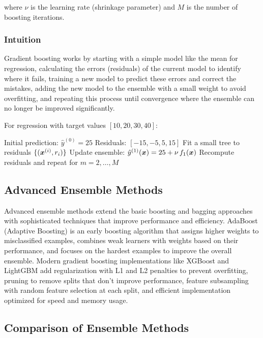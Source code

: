 where $\nu$ is the learning rate (shrinkage parameter) and $M$ is the number of boosting iterations.

\subsubsection{Intuition}

Gradient boosting works by starting with a simple model like the mean for regression, calculating the errors (residuals) of the current model to identify where it fails, training a new model to predict these errors and correct the mistakes, adding the new model to the ensemble with a small weight to avoid overfitting, and repeating this process until convergence where the ensemble can no longer be improved significantly.

\begin{example}
For regression with target values $[10, 20, 30, 40]$:

\begin{algorithmic}[1]
\State Initial prediction: $\hat{y}^{(0)} = 25$ 
\State Residuals: $[-15, -5, 5, 15]$ 
\State Fit a small tree to residuals $\{(\boldsymbol{x}^{(i)}, r_i)\}$
\State Update ensemble: $\hat{y}^{(1)}(\boldsymbol{x}) = 25 + \nu\, f_1(\boldsymbol{x})$
\State Recompute residuals and repeat for $m=2,\dots,M$
\end{algorithmic}
\end{example}

\subsection{Advanced Ensemble Methods}

Advanced ensemble methods extend the basic boosting and bagging approaches with sophisticated techniques that improve performance and efficiency. AdaBoost (Adaptive Boosting) is an early boosting algorithm that assigns higher weights to misclassified examples, combines weak learners with weights based on their performance, and focuses on the hardest examples to improve the overall ensemble. Modern gradient boosting implementations like XGBoost and LightGBM add regularization with L1 and L2 penalties to prevent overfitting, pruning to remove splits that don't improve performance, feature subsampling with random feature selection at each split, and efficient implementation optimized for speed and memory usage.

\subsection{Comparison of Ensemble Methods}

